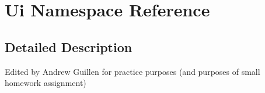 \hypertarget{namespace_ui}{\section{Ui Namespace Reference}
\label{namespace_ui}
}


\subsection{Detailed Description}
Edited by Andrew Guillen for practice purposes (and purposes of small homework assignment) 